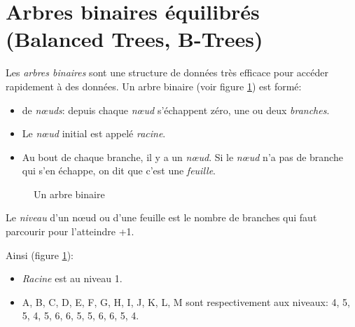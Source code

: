 \section{Arbres binaires équilibrés (Balanced Trees, B-Trees)}\label{btree}
Les \emph{arbres binaires} sont une structure de données très efficace
pour accéder rapidement à des données. Un arbre binaire (voir figure
\ref{bt1})  est formé:
\begin{itemize}

\item de \emph{n{\oe}uds}: depuis chaque \emph{n{\oe}ud} s'échappent zéro,
  une ou deux \emph{branches}.
\item Le \emph{n{\oe}ud} initial est appelé \emph{racine}.
\item Au bout de chaque branche, il y a un \emph{n{\oe}ud}. Si le
  \emph{n{\oe}ud} n'a pas de branche qui s'en échappe, on dit que
  c'est une \emph{feuille}.
\end{itemize}

\begin{figure}
\caption{Un arbre binaire}\label{bt1}
\end{figure}

 Le \emph{niveau} d'un n{\oe}ud ou d'une feuille est le nombre de branches
 qui faut parcourir pour l'atteindre +1.

 Ainsi (figure \ref{bt1}):
 \begin{itemize}
 \item \emph{Racine} est au niveau 1.
 \item A, B, C, D, E, F, G,  H, I, J, K, L, M sont respectivement aux niveaux:
   4, 5, 5, 4, 5, 6, 6,  5, 5, 6, 6, 5, 4.
 \end{itemize}
   
